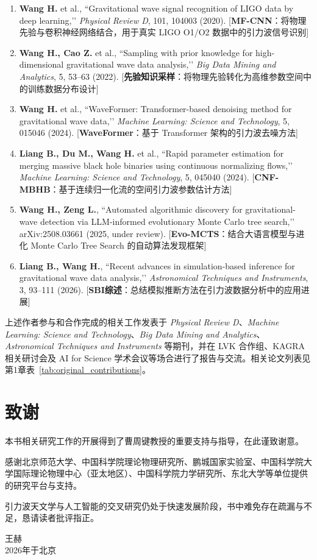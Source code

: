 \begin{enumerate}
    \item \textbf{Wang H.} et al., ``Gravitational wave signal recognition of LIGO data by deep learning,’’ \textit{Physical Review D}, 101, 104003 (2020).
    [\textbf{MF-CNN}：将物理先验与卷积神经网络结合，用于真实 LIGO O1/O2 数据中的引力波信号识别]

    \item \textbf{Wang H., Cao Z.} et al., ``Sampling with prior knowledge for high-dimensional gravitational wave data analysis,’’ \textit{Big Data Mining and Analytics}, 5, 53--63 (2022).
    [\textbf{先验知识采样}：将物理先验转化为高维参数空间中的训练数据分布设计]
    
    \item \textbf{Wang H.} et al., ``WaveFormer: Transformer-based denoising method for gravitational wave data,’’ \textit{Machine Learning: Science and Technology}, 5, 015046 (2024).
    [\textbf{WaveFormer}：基于 Transformer 架构的引力波去噪方法]
    
    \item \textbf{Liang B., Du M., Wang H.} et al., ``Rapid parameter estimation for merging massive black hole binaries using continuous normalizing flows,’’ \textit{Machine Learning: Science and Technology}, 5, 045040 (2024).
    [\textbf{CNF-MBHB}：基于连续归一化流的空间引力波参数估计方法]

    \item \textbf{Wang H., Zeng L.}, ``Automated algorithmic discovery for gravitational-wave detection via LLM-informed evolutionary Monte Carlo tree search,’’ arXiv:2508.03661 (2025, under review).
    [\textbf{Evo-MCTS}：结合大语言模型与进化 Monte Carlo Tree Search 的自动算法发现框架]
    
    \item \textbf{Liang B., Wang H.}, ``Recent advances in simulation-based inference for gravitational wave data analysis,’’ \textit{Astronomical Techniques and Instruments}, 3, 93–111 (2026).
    [\textbf{SBI综述}：总结模拟推断方法在引力波数据分析中的应用进展]
\end{enumerate}

上述作者参与和合作完成的相关工作发表于 \textit{Physical Review D}、\textit{Machine Learning: Science and Technology}、\textit{Big Data Mining and Analytics}、\textit{Astronomical Techniques and Instruments} 等期刊，并在 LVK 合作组、KAGRA 相关研讨会及 AI for Science 学术会议等场合进行了报告与交流。相关论文列表见第1章表~\ref{tab:original_contributions}。

\section*{致谢}

本书相关研究工作的开展得到了曹周键教授的重要支持与指导，在此谨致谢意。

感谢北京师范大学、中国科学院理论物理研究所、鹏城国家实验室、中国科学院大学国际理论物理中心（亚太地区）、中国科学院力学研究所、东北大学等单位提供的研究平台与支持。

引力波天文学与人工智能的交叉研究仍处于快速发展阶段，书中难免存在疏漏与不足，恳请读者批评指正。

\vspace{2em}
\begin{flushright}
王赫\\
2026年于北京
\end{flushright}
